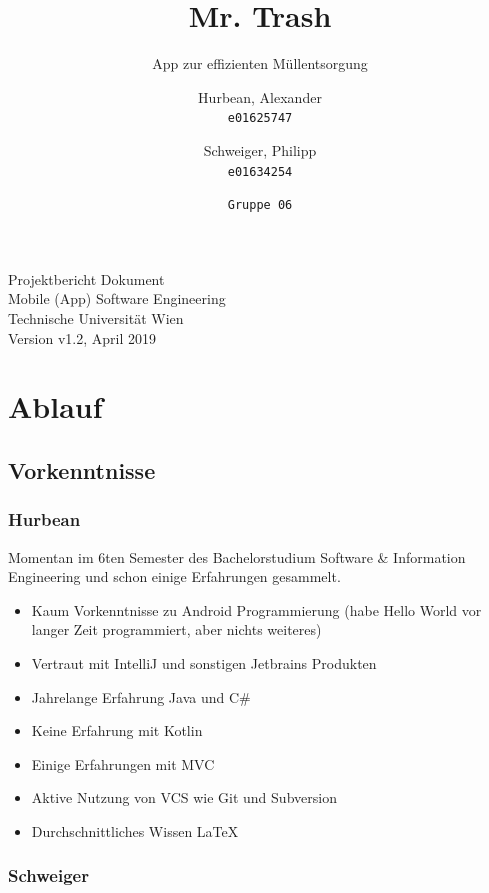 \documentclass{mrtrash}
\title{\vspace{-1cm}Mr. Trash}
\subtitle{App zur effizienten Müllentsorgung}
\author{
    Hurbean, Alexander\\
    \texttt{e01625747}
    \and
    Schweiger, Philipp\\
    \texttt{e01634254}
    \and
    \texttt{Gruppe 06}}
\begin{document}
\maketitle

\null\vfill
\noindent
Projektbericht Dokument\\ 
Mobile (App) Software Engineering\\
Technische Universität Wien\\
Version v1.2, April 2019
\newpage

\tableofcontents

\chapter{Ablauf}

\section{Vorkenntnisse}

\subsection{Hurbean}

Momentan im 6ten Semester des Bachelorstudium Software \& Information Engineering und schon einige Erfahrungen gesammelt.

\begin{itemize}
    \item Kaum Vorkenntnisse zu Android Programmierung (habe Hello World vor langer Zeit programmiert, aber nichts weiteres)
    \item Vertraut mit IntelliJ und sonstigen Jetbrains Produkten
    \item Jahrelange Erfahrung Java und C\#
    \item Keine Erfahrung mit Kotlin
    \item Einige Erfahrungen mit MVC
    \item Aktive Nutzung von VCS wie Git und Subversion
    \item Durchschnittliches Wissen \LaTeX
\end{itemize}

\begin{minipage}[t]{\textwidth}
    \centering
\end{minipage}

\subsection{Schweiger}
\end{document}
